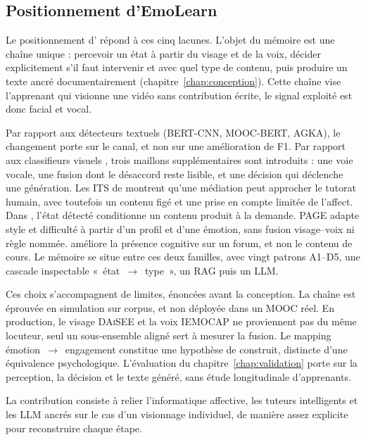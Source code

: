 \subsection{Positionnement d'EmoLearn}
\label{subsec:ea-positionnement}

Le positionnement d'\emolearn{} répond à ces cinq lacunes. L'objet du
mémoire est une chaîne unique : percevoir un état à partir du visage et
de la voix, décider explicitement s'il faut intervenir et avec quel type
de contenu, puis produire un texte ancré documentairement
(chapitre~\ref{chap:conception}). Cette chaîne vise l'apprenant qui
visionne une vidéo sans contribution écrite, le signal exploité est
donc facial et vocal.

Par rapport aux détecteurs textuels (BERT-CNN, MOOC-BERT, AGKA), le
changement porte sur le canal, et non sur une amélioration de F1. Par
rapport aux classifieurs visuels
\cite{whitehill2014faces,xiong2024cnntransformer}, trois maillons
supplémentaires sont introduits : une voie vocale, une fusion dont le
désaccord reste lisible, et une décision qui déclenche une génération.
Les ITS de \textcite{vanlehn2011relative} montrent qu'une médiation peut
approcher le tutorat humain, avec toutefois un contenu figé et une prise
en compte limitée de l'affect. Dans \emolearn{}, l'état détecté
conditionne un contenu produit à la demande. PAGE \cite{hu2025page}
adapte style et difficulté à partir d'un profil et d'une émotion, sans
fusion visage--voix ni règle nommée. \textcite{kong2025exploratory}
améliore la présence cognitive sur un forum, et non le contenu de cours.
Le mémoire se situe entre ces deux familles, avec vingt patrons A1--D5,
une cascade inspectable «~état~$\rightarrow$~type~», un RAG puis un LLM.

Ces choix s'accompagnent de limites, énoncées avant la conception. La
chaîne est éprouvée en simulation sur corpus, et non déployée dans un
MOOC réel. En production, le visage \textsc{DAiSEE} et la voix
\textsc{IEMOCAP} ne proviennent pas du même locuteur, seul un
sous-ensemble aligné sert à mesurer la fusion. Le mapping
émotion~$\rightarrow$~engagement constitue une hypothèse de construit,
distincte d'une équivalence psychologique. L'évaluation du
chapitre~\ref{chap:validation} porte sur la perception, la décision et le
texte généré, sans étude longitudinale d'apprenants.

La contribution consiste à relier l'informatique affective, les tuteurs
intelligents et les LLM ancrés sur le cas d'un visionnage individuel, de
manière assez explicite pour reconstruire chaque étape.

